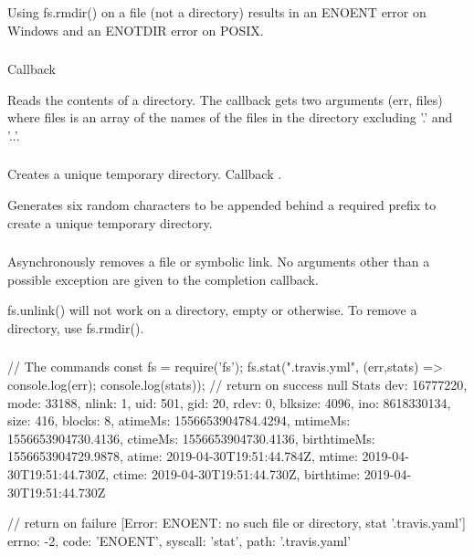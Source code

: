 Using fs.rmdir() on a file (not a directory) results in an ENOENT error on
Windows and an ENOTDIR error on POSIX.



\subsubsection{}

Callback 

Reads the contents of a directory. The callback gets two arguments (err,
files) where files is an array of the names of the files in the directory
excluding '.' and '..'.

\subsubsection{}

Creates a unique temporary directory. Callback .

Generates six random characters to be appended behind a required prefix to
create a unique temporary directory.




\subsubsection{}

Asynchronously removes a file or symbolic link. No arguments other than a
possible exception are given to the completion callback.

fs.unlink() will not work on a directory, empty or otherwise. To remove a
directory, use fs.rmdir().




\subsubsection{}

\begin{js}
  // The commands
  const fs = require('fs');
  fs.stat(".travis.yml", (err,stats) => {console.log(err);
                                         console.log(stats)});
  // return on success
  null
  Stats {
    dev: 16777220,
    mode: 33188,
    nlink: 1,
    uid: 501,
    gid: 20,
    rdev: 0,
    blksize: 4096,
    ino: 8618330134,
    size: 416,
    blocks: 8,
    atimeMs: 1556653904784.4294,
    mtimeMs: 1556653904730.4136,
    ctimeMs: 1556653904730.4136,
    birthtimeMs: 1556653904729.9878,
    atime: 2019-04-30T19:51:44.784Z,
    mtime: 2019-04-30T19:51:44.730Z,
    ctime: 2019-04-30T19:51:44.730Z,
    birthtime: 2019-04-30T19:51:44.730Z }

  // return on failure
  { [Error: ENOENT: no such file or directory, stat '.travis.yaml']
    errno: -2,
    code: 'ENOENT',
    syscall: 'stat',
    path: '.travis.yaml' }
\end{js}

